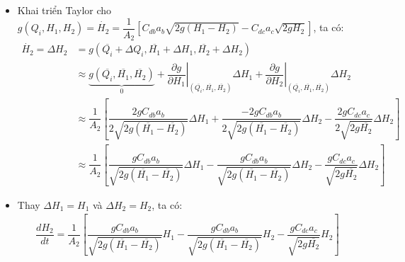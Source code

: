 \begin{enumerate}[\it a.]
\begin{itemize}
\begin{itemize}
                        \item Khai triển Taylor cho $g\left({Q_i, H_1, H_2}\right) = \dot{H_2} = \dfrac{1}{A_2} \left[{C_{db}a_b\sqrt{2g(H_1 - H_2)} - C_{dc}a_c\sqrt{2gH_2}}\right]$, ta có:
                            \begin{align}
                                \dot{H_2} = \Delta H_2 & = g\left({\overline{Q_i} + \Delta Q_i, \overline{H_1} + \Delta H_1, \overline{H_2} + \Delta H_2}\right) \\
                                & \approx \underbrace{g\left({\overline{Q_i}, \overline{H_1}, \overline{H_2}}\right)}_{0} + \left.\dfrac{\partial g}{\partial H_1}\right|_{\left({\overline{Q_i}, \overline{H_1}, \overline{H_2}}\right)} \Delta H_1 + \left.\dfrac{\partial g}{\partial H_2}\right|_{\left({\overline{Q_i}, \overline{H_1}, \overline{H_2}}\right)} \Delta H_2\\
                                & \approx \dfrac{1}{A_2} \left[{\dfrac{2g C_{db}a_b}{2 \sqrt{2g(\overline{H_1} - \overline{H_2})}} \Delta H_1 + \dfrac{-2g C_{db}a_b}{2 \sqrt{2g(\overline{H_1} - \overline{H_2})}} \Delta H_2 - \dfrac{2g C_{dc}a_c}{2 \sqrt{2g\overline{H_2}}} \Delta H_2}\right]\\
                                & \approx \dfrac{1}{A_2} \left[{\dfrac{g C_{db}a_b}{\sqrt{2g(\overline{H_1} - \overline{H_2})}} \Delta H_1 - \dfrac{g C_{db}a_b}{\sqrt{2g(\overline{H_1} - \overline{H_2})}} \Delta H_2 - \dfrac{g C_{dc}a_c}{\sqrt{2g\overline{H_2}}} \Delta H_2}\right]
                            \end{align}

                        \item Thay $\Delta H_1= H_1$ và $\Delta H_2 = H_2$, ta có:
                            \begin{align}
                                \dfrac{dH_2}{dt} = \dfrac{1}{A_2} \left[{\dfrac{g C_{db}a_b}{\sqrt{2g(\overline{H_1} - \overline{H_2})}} H_1 - \dfrac{g C_{db}a_b}{\sqrt{2g(\overline{H_1} - \overline{H_2})}} H_2 - \dfrac{g C_{dc}a_c}{\sqrt{2g\overline{H_2}}} H_2}\right]
                            \end{align}
                    \end{itemize}


\end{itemize}
\end{enumerate}
